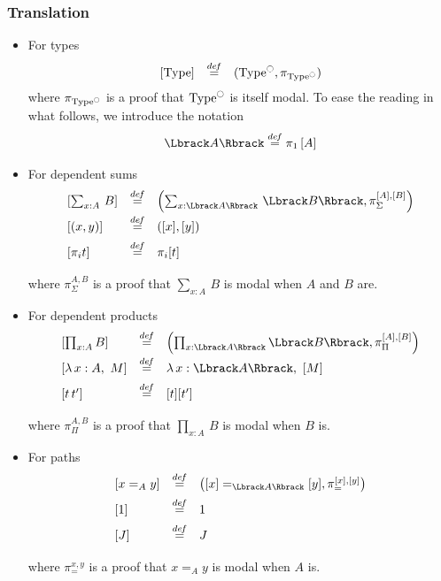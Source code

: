 \documentclass{beamer}
\newcommand \defeq {\overset{de\hspace{-0.2ex}f}{=}}
\DeclareMathOperator{\Type}{Type}
\newcommand{\modal}{\ensuremath{\ocircle}}
\newcommand{\sumD}[3]{\sum_{#1:#2}\, #3}
\newcommand{\prodD}[3]{\prod_{#1:#2}\, #3}
\begin{document}
\begin{frame}[allowframebreaks]
  \frametitle{Translation}
  \begin{itemize}
  \item For types
    \[
    \begin{array}{lcl}
      \left[ \Type\right] &\defeq& (\Type^\modal,\pi_{\Type^\modal})
    \end{array}
    \]
    where $\pi_{\Type^\modal}$ is a proof that $\Type^\modal$ is itself
    modal.
    To ease the reading in what follows, we introduce the notation  \[ 
    \Lbrack A \Rbrack \defeq \pi_1 \left[ A \right]\]

  \item For dependent sums
    \[
    \begin{array}{lcl}
      \left[ \sumD x A B \right] &\defeq&  \left( \sumD x{\Lbrack A \Rbrack}
        {\Lbrack B\Rbrack} , \pi_\Sigma^{[A],[B]}
      \right)\\[0.5em]
      \left[  (x,y)\right] &\defeq& ([x],[y]) \\[0.5em]
      \left[  \pi_i t\right] &\defeq& \pi_i [t] \\[0.5em]
    \end{array}
    \]
    where $\pi_{\Sigma}^{A,B}$ is a proof that $\sumD x A B$ is modal when
    $A$ and $B$ are.
  \item For dependent products
    \[
    \begin{array}{lcl}
      \left[ \prod_{x:A} B \right] &\defeq& \left( \prod_{x:\Lbrack A \Rbrack}
        \Lbrack B\Rbrack , \pi_{\Pi}^{[A],[B]}
      \right)\\[0.5em]
      \left[  \lambda\, x:A,~M \right] &\defeq&\lambda\,x:\Lbrack A
      \Rbrack,~[ M ]
      \\[0.5em]
      \left[ t \, t' \right] &\defeq& [t] [t'] \\[0.5em]
    \end{array}
    \]
    where $\pi_{\Pi}^{A,B}$ is a proof that $\prodD x A B$ is modal when $B$ is.
  \item For paths
    \[
    \begin{array}{lcl}
      \left[  x=_A y \right] &\defeq& \left( [x] =_{\Lbrack A\Rbrack} [y] , \pi_=^{[x],[y]}
      \right)\\[0.5em]
      \left[ 1 \right] &\defeq& 1\\[0.5em]
      \left[ J \right] &\defeq& J \\[0.5em]
    \end{array}
    \]
    where $\pi_{=}^{x,y}$ is a proof that $x=_A y$ is modal when $A$ is.

\end{itemize}
\end{frame}
\end{document}
